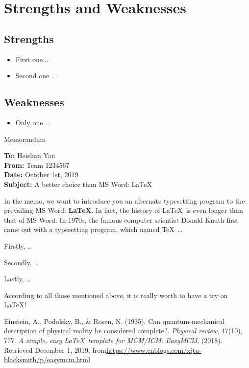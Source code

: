 \documentclass[12pt]{article}  %
\begin{document}
\section{Strengths and Weaknesses}
\subsection{Strengths}
\begin{itemize}
    \item First one...
    \item Second one ...
\end{itemize}

\subsection{Weaknesses}
\begin{itemize}
    \item Only one ...
 \end{itemize}


\begin{letter}{Memorandum}
\begin{flushleft}  %
\textbf{To:} Heishan Yan\\
\textbf{From:} Team 1234567\\
\textbf{Date:} October 1st, 2019\\
\textbf{Subject:} A better choice than MS Word: \LaTeX
\end{flushleft}

In the memo, we want to introduce you an alternate typesetting program to the prevailing MS Word: \textbf{\LaTeX}. In fact, the history of \LaTeX\ is even longer than that of MS Word. In 1970s, the famous computer scientist Donald Knuth first came out with a typesetting program, which named \TeX\ \ldots

Firstly, \ldots

Secondly, \ldots

Lastly, \ldots

According to all those mentioned above, it is really worth to have a try on \LaTeX! 
\end{letter}


\begin{thebibliography}{99}
 Einstein, A., Podolsky, B., \& Rosen, N. (1935). Can quantum-mechanical description of physical reality be considered complete?. \emph{Physical review}, 47(10), 777.
 \emph{A simple, easy \LaTeX\ template for MCM/ICM: EasyMCM}. (2018). Retrieved December 1, 2019, from\url{https://www.cnblogs.com/xjtu-blacksmith/p/easymcm.html}
\end{thebibliography}
\end{document}
